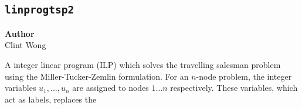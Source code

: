 \subsection{\texttt{linprogtsp2}}
\label{subsec:linprogtsp2}

\begin{flushright}
\textbf{Author} \\
Clint Wong
\end{flushright}

A integer linear program (ILP) which solves the travelling salesman problem using the Miller-Tucker-Zemlin formulation. For an $n$-node problem, the integer variables $u_1, \dots ,u_n$ are assigned to nodes $1\dots n$ respectively. These variables, which act as labels, replaces the  




